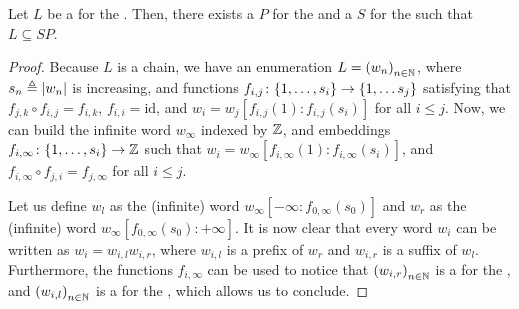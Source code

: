 \begin{lemma}
    \label{chains-infix:lem}
    Let $L$ be a  for the . Then, there exists
    a  $P$ for the  and a 
    $S$ for the  such that $L \subseteq SP$.
\end{lemma}
\begin{proof}
    Because $L$ is a chain,
    we have an enumeration $L = \seqof{w_n}$,
    where $s_n \triangleq \left| w_n \right|$ is increasing, 
    and functions
    $f_{i,j} \colon \{ 1, \dots, s_i \} \to \{ 1, \dots s_{j} \}$
    satisfying
    that $f_{j,k} \circ f_{i, j} = f_{i, k}$,
    $f_{i,i} = \mathrm{id}$, and
    $w_i = w_j[f_{i,j}(1):f_{i,j}(s_i)]$ for all $i \leq j$.
    Now, we can build the infinite word $w_\infty$ indexed by $\mathbb{Z}$, and
    embeddings $f_{i, \infty} \colon \{ 1, \dots, s_i \} \to \mathbb{Z}$ such that
    $w_i = w_\infty[f_{i, \infty}(1):f_{i, \infty}(s_i)]$, and $f_{i, \infty}
    \circ f_{j, i} = f_{j, \infty}$ for all $i \leq j$.

    Let us define $w_l$ as the (infinite) word $w_\infty[-\infty: f_{0,
    \infty}(s_0)]$ and $w_r$ as the (infinite) word $w_\infty[f_{0,
    \infty}(s_0): +\infty]$. It is now clear that every word $w_i$ can be
    written as $w_i = w_{i,l} w_{i,r}$, where $w_{i,l}$ is a prefix of $w_r$
    and $w_{i,r}$ is a suffix of $w_l$. Furthermore, the functions $f_{i,
    \infty}$ can be used to notice that $\seqof{w_{i,r}}$ is a  for
    the , and $\seqof{w_{i,l}}$ is a  for the
    , which allows us to conclude.
\end{proof}



